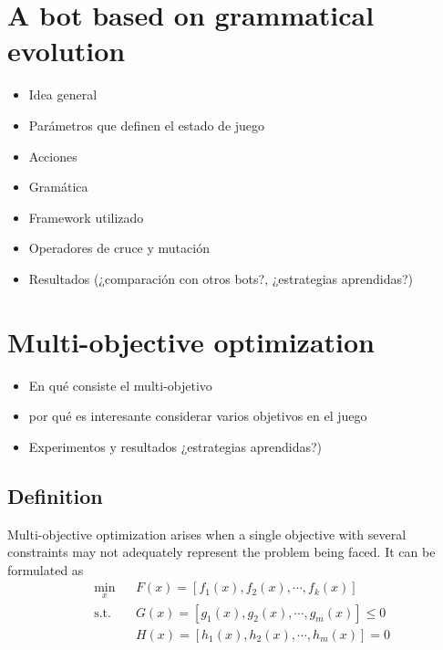 \documentclass{llncs}
\begin{document}
%
\section{A bot based on grammatical evolution}
\label{sec:sec1}
%

\begin{itemize}
\item Idea general
\item Parámetros que definen el estado de juego
\item Acciones
\item Gramática
\item Framework utilizado
\item Operadores de cruce y mutación
\item Resultados (¿comparación con otros bots?, ¿estrategias aprendidas?)
\end{itemize}


%
\section{Multi-objective optimization}
\label{sec:sec3}
%

\begin{itemize}
\item En qué consiste el multi-objetivo
\item por qué es interesante considerar varios objetivos en el juego
\item Experimentos y resultados  ¿estrategias aprendidas?)
\end{itemize}

\subsection{Definition}
Multi-objective optimization arises when a single objective with several constraints may not adequately represent the problem being faced. It can be formulated as
\begin{equation}
\begin{aligned}
& \underset{x}{\text{min}}
& & F(x) = [f_1(x), f_2(x), \cdots, f_k(x)] \\
& \text{s.t.} & &  G(x) = [g_1(x), g_2(x), \cdots, g_m(x)] \leq 0 \\
& & &  H(x) = [h_1(x), h_2(x), \cdots, h_m(x)] = 0 \\
\end{aligned}
\end{equation}
\end{document}
